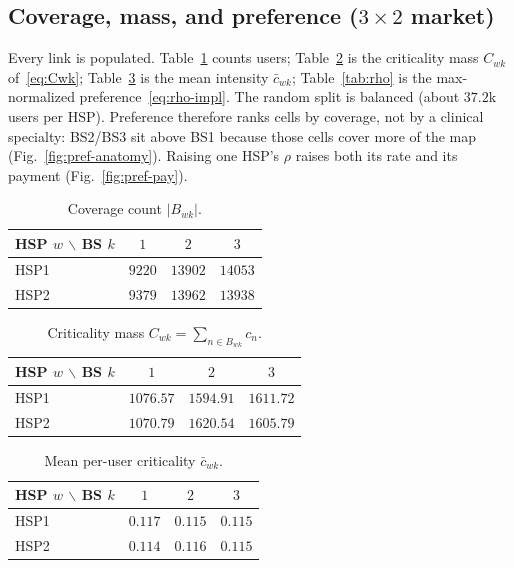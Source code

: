 \documentclass[journal,a4paper,10pt]{IEEEtran}
\begin{document}
\subsection{Coverage, mass, and preference (\(3\times 2\) market)}
Every link is populated. Table~\ref{tab:Nwk} counts users; Table~\ref{tab:Cwk} is the criticality mass \(C_{wk}\) of~\eqref{eq:Cwk}; Table~\ref{tab:cbar} is the mean intensity \(\bar c_{wk}\); Table~\ref{tab:rho} is the max-normalized preference~\eqref{eq:rho-impl}. The random split is balanced (about \(37.2\)k users per HSP). Preference therefore ranks cells by coverage, not by a clinical specialty: BS2/BS3 sit above BS1 because those cells cover more of the map (Fig.~\ref{fig:pref-anatomy}). Raising one HSP's \(\rho\) raises both its rate and its payment (Fig.~\ref{fig:pref-pay}).

\begin{table}[!t]
\caption{Coverage count \(\lvert B_{wk}\rvert\).}
\label{tab:Nwk}
\centering
\begin{tabular}{@{}lccc@{}}
\toprule
HSP \(w\) \(\backslash\) BS \(k\) & \(1\) & \(2\) & \(3\) \\
\midrule
HSP1  & \(9220\) & \(13902\) & \(14053\) \\
HSP2  & \(9379\) & \(13962\) & \(13938\) \\
\bottomrule
\end{tabular}
\end{table}

\begin{table}[!t]
\caption{Criticality mass \(C_{wk}=\sum_{n\in B_{wk}}c_n\).}
\label{tab:Cwk}
\centering
\begin{tabular}{@{}lccc@{}}
\toprule
HSP \(w\) \(\backslash\) BS \(k\) & \(1\) & \(2\) & \(3\) \\
\midrule
HSP1  & \(1076.57\) & \(1594.91\) & \(1611.72\) \\
HSP2  & \(1070.79\) & \(1620.54\) & \(1605.79\) \\
\bottomrule
\end{tabular}
\end{table}

\begin{table}[!t]
\caption{Mean per-user criticality \(\bar c_{wk}\).}
\label{tab:cbar}
\centering
\begin{tabular}{@{}lccc@{}}
\toprule
HSP \(w\) \(\backslash\) BS \(k\) & \(1\) & \(2\) & \(3\) \\
\midrule
HSP1  & \(0.117\) & \(0.115\) & \(0.115\) \\
HSP2  & \(0.114\) & \(0.116\) & \(0.115\) \\
\bottomrule
\end{tabular}
\end{table}
\end{document}
